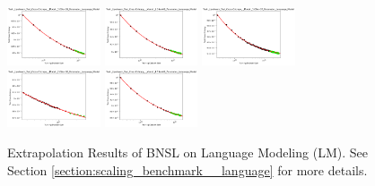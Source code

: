 \documentclass{article} %
\begin{document}
\begin{figure}
    \centering


\includegraphics[width=0.245\textwidth]{figures/scaling_laws_benchmark_dataset_plots/validation_loss___1.07e+09.png}
\includegraphics[width=0.245\textwidth]{figures/scaling_laws_benchmark_dataset_plots/validation_loss___1.34e+08.png}
\includegraphics[width=0.245\textwidth]{figures/scaling_laws_benchmark_dataset_plots/validation_loss___1.68e+07.png}
\includegraphics[width=0.245\textwidth]{figures/scaling_laws_benchmark_dataset_plots/validation_loss___2.62e+08.png}
\includegraphics[width=0.245\textwidth]{figures/scaling_laws_benchmark_dataset_plots/validation_loss___4.53e+08.png}

    \caption{
    Extrapolation Results of BNSL on Language Modeling (LM). See Section \ref{section:scaling_benchmark__language} for more details.
    }
    \label{fig:scaling_laws_benchmark_dataset__language_modeling}
\end{figure}
\end{document}
